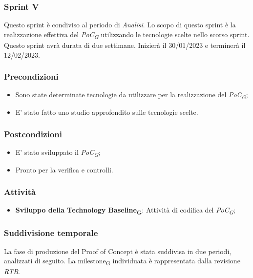 \subsubsection{Sprint V}
Questo sprint è condiviso al periodo di \textit{Analisi}. Lo scopo di questo sprint è la realizzazione effettiva del \textit{PoC\textsubscript{G}} utilizzando le tecnologie scelte nello scorso sprint.
Questo sprint avrà durata di due settimane. Inizierà il 30/01/2023 e terminerà il 12/02/2023.

\subsubsection{Precondizioni}\:
\begin{itemize}
	\item Sono state determinate tecnologie da utilizzare per la realizzazione del \textit{PoC\textsubscript{G}};
	\item E' stato fatto uno studio approfondito sulle tecnologie scelte.
\end{itemize}

\subsubsection{Postcondizioni}\:
\begin{itemize}
	\item E' stato sviluppato il \textit{PoC\textsubscript{G}};
	\item Pronto per la verifica e controlli.
\end{itemize}

\subsubsection{Attività}\:
\begin{itemize}
    \item \textbf{Sviluppo della Technology Baseline\textsubscript{G}}: Attività di codifica del \textit{PoC\textsubscript{G}};
\end{itemize}

\subsubsection{Suddivisione temporale}
La fase di produzione del Proof of Concept è stata suddivisa in due periodi, analizzati di seguito. La milestone\textsubscript{G} individuata è rappresentata dalla revisione \textit{RTB}.

